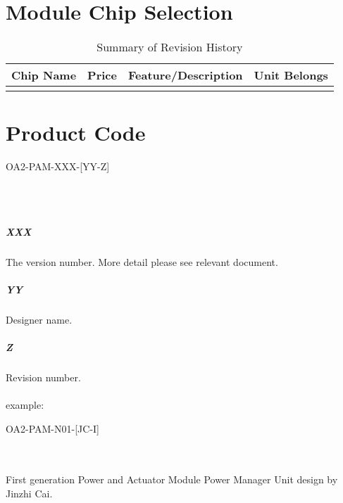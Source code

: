 \documentclass[12pt,article]{memoir}
\begin{document}
\section{Module Chip Selection}
\begin{table}[H]
	\centering
	\begin{tabu}{ c | c | c | c }
		Chip Name & Price & Feature/Description & Unit Belongs\\ \hline
		 & & & \\
	\end{tabu}
	\caption{Summary of Revision History}
	\label{tab:slc}
\end{table}
\section{Product Code}
\begin{LARGE}
OA2-PAM-XXX-[YY-Z]
\end{LARGE}\\\\
\subparagraph{XXX}
The version number. More detail please see relevant document.
\subparagraph{YY}
Designer name.
\subparagraph{Z}
Revision number.\\\\
example: 
\begin{large}
OA2-PAM-N01-[JC-I]
\end{large}\\\\
First generation Power and Actuator Module Power Manager Unit design by Jinzhi Cai.
\newpage

\end{document}
